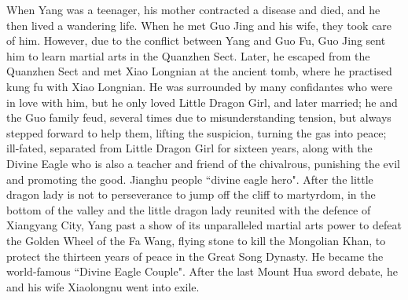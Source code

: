 \documentclass[doctor, vlined, ]{DissertUESTC}
\begin{document}
	When Yang was a teenager, his mother contracted a disease and died, and he then lived a wandering life. When he met Guo Jing and his wife, they took care of him. However, due to the conflict between Yang and Guo Fu, Guo Jing sent him to learn martial arts in the Quanzhen Sect. Later, he escaped from the Quanzhen Sect and met Xiao Longnian at the ancient tomb, where he practised kung fu with Xiao Longnian. He was surrounded by many confidantes who were in love with him, but he only loved Little Dragon Girl, and later married; he and the Guo family feud, several times due to misunderstanding tension, but always stepped forward to help them, lifting the suspicion, turning the gas into peace; ill-fated, separated from Little Dragon Girl for sixteen years, along with the Divine Eagle who is also a teacher and friend of the chivalrous, punishing the evil and promoting the good. Jianghu people ``divine eagle hero". After the little dragon lady is not to perseverance to jump off the cliff to martyrdom, in the bottom of the valley and the little dragon lady reunited with the defence of Xiangyang City, Yang past a show of its unparalleled martial arts power to defeat the Golden Wheel of the Fa Wang, flying stone to kill the Mongolian Khan, to protect the thirteen years of peace in the Great Song Dynasty. He became the world-famous ``Divine Eagle Couple". After the last Mount Hua sword debate, he and his wife Xiaolongnu went into exile.

\end{document}
